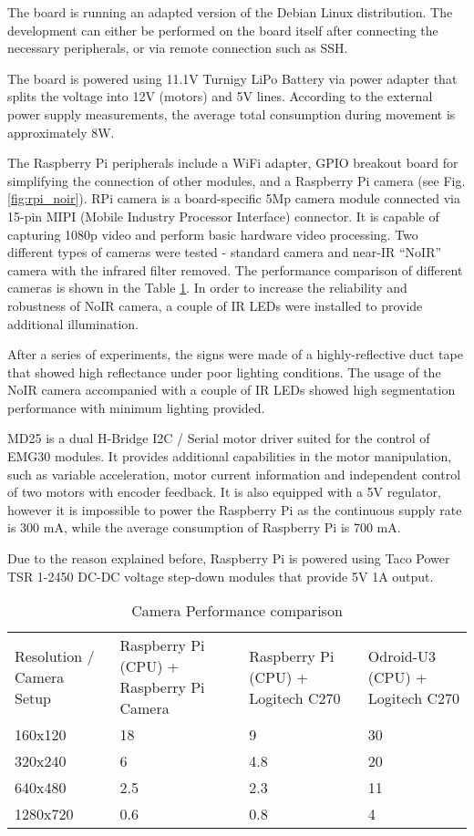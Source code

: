 The board is running an adapted version of the Debian Linux distribution. The
development can either be performed on the board itself after connecting the
necessary peripherals, or via remote connection such as SSH.

The board is powered using 11.1V Turnigy LiPo Battery via power adapter that
splits the voltage into 12V (motors) and 5V lines. According to the external
power supply measurements, the average total consumption during movement is
approximately 8W.

The Raspberry Pi peripherals include a WiFi adapter, GPIO breakout board for
simplifying the connection of other modules, and a Raspberry Pi camera (see
Fig. \ref{fig:rpi_noir}).
RPi camera is a board-specific 5Mp camera module connected via 15-pin MIPI (Mobile Industry
Processor Interface) connector. It is capable of capturing 1080p video and
perform basic hardware video processing. Two different types of cameras were
tested - standard camera and near-IR ``NoIR'' camera with the infrared filter
removed.
The performance comparison of different cameras is shown in the Table
\ref{tab:cam_perf}.  In order to increase the reliability and robustness of 
NoIR camera, a couple of IR LEDs were installed to provide additional illumination.

After a series of experiments, the signs were made of a highly-reflective duct
tape that showed high reflectance under poor lighting
conditions. The usage of the NoIR camera accompanied with a couple of IR LEDs
showed high segmentation performance with minimum lighting provided.

MD25 is a dual H-Bridge I2C / Serial motor driver suited for the control of
EMG30 modules.
It provides additional capabilities in the motor manipulation, such as variable
acceleration, motor current information and independent control of two motors
with encoder feedback. It is also equipped with a 5V regulator, however it is
impossible to power the Raspberry Pi as the continuous supply rate is 300 mA,
while the average consumption of Raspberry Pi is 700 mA.

Due to the reason explained before, Raspberry Pi is powered using Taco Power TSR
1-2450 DC-DC voltage step-down modules that provide 5V 1A output.

\begin{table}[h!]
	\setlength\extrarowheight{2pt}
	\setlength\arraycolsep{5pt}
    \begin{tabularx}{\textwidth}{XXXX}
    Resolution / Camera Setup & Raspberry Pi  (CPU) + Raspberry Pi Camera &
    Raspberry Pi (CPU) + Logitech C270 & Odroid-U3 (CPU) + Logitech C270 \\
    160x120            & 18           & 9          & 30         \\
    320x240            & 6            & 4.8        & 20         \\
    640x480            & 2.5          & 2.3        & 11         \\
    1280x720           & 0.6          & 0.8        & 4          \\
    \end{tabularx}
    \caption{Camera Performance comparison}
    \label{tab:cam_perf}
\end{table}

